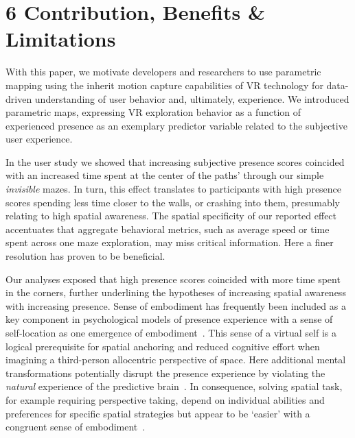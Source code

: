 \section{6 Contribution, Benefits \& Limitations}
With this paper, we motivate developers and researchers to use parametric mapping using the inherit motion capture capabilities of VR technology for data-driven understanding of user behavior and, ultimately, experience. We introduced parametric maps, expressing VR exploration behavior as a function of experienced presence as an exemplary predictor variable related to the subjective user experience. 

In the user study we showed that increasing subjective presence scores coincided with an increased time spent at the center of the paths' through our simple \textit{invisible} mazes. In turn, this effect translates to participants with high presence scores spending less time closer to the walls, or crashing into them, presumably relating to high spatial awareness. The spatial specificity of our reported effect accentuates that aggregate behavioral metrics, such as average speed or time spent across one maze exploration, may miss critical information. Here a finer resolution has proven to be beneficial.

Our analyses exposed that high presence scores coincided with more time spent in the corners, further underlining the hypotheses of increasing spatial awareness with increasing presence. Sense of embodiment has frequently been included as a key component in psychological models of presence experience with a sense of self-location as one emergence of embodiment~\cite{Kilteni2012}. This sense of a virtual self is a logical prerequisite for spatial anchoring and reduced cognitive effort when imagining a third-person allocentric perspective of space. Here additional mental transformations potentially disrupt the presence experience by violating the \textit{natural} experience of the predictive brain~\cite{Gonzalez-Franco2017}. In consequence, solving spatial task, for example requiring perspective taking, depend on individual abilities and preferences for specific spatial strategies but appear to be `easier' with a congruent sense of embodiment~\cite{Pan2018, Gramann2005, Cognition2016}.

